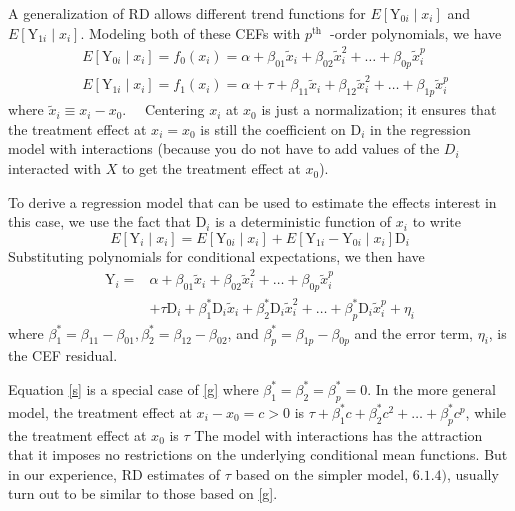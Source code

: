 \documentclass[11pt]{book}%
\begin{document}
A generalization of RD  allows different trend functions for $E\left[\mathrm{Y}_{0 i} \mid x_{i}\right]$ and $E\left[\mathrm{Y}_{1 i} \mid x_{i}\right] .$
Modeling both of these CEFs with $p^{\text {th }}$ -order polynomials, we have
$$
\begin{aligned}
&E\left[\mathrm{Y}_{0 i} \mid x_{i}\right]=f_{0}\left(x_{i}\right)=\alpha+\beta_{01} \tilde{x}_{i}+\beta_{02} \tilde{x}_{i}^{2}+\ldots+\beta_{0 p} \tilde{x}_{i}^{p} \\
&E\left[\mathrm{Y}_{1 i} \mid x_{i}\right]=f_{1}\left(x_{i}\right)=\alpha+\tau+\beta_{11} \tilde{x}_{i}+\beta_{12} \tilde{x}_{i}^{2}+\ldots+\beta_{1 p} \tilde{x}_{i}^{p}
\end{aligned}
$$
where $\tilde{x}_{i} \equiv x_{i}-x_{0} . \quad$ Centering $x_{i}$ at $x_{0}$ is just a normalization; it ensures that the treatment effect at
$x_{i}=x_{0}$ is still the coefficient on $\mathrm{D}_{i}$ in the regression model with interactions (because you do not have to add values of the $D_{i}$ interacted with $X$ to get the treatment effect at $x_{0}$).

To derive a regression model that can be used to estimate the effects interest in this case, we use the fact
that $\mathrm{D}_{i}$ is a deterministic function of $x_{i}$ to write
$$
E\left[\mathrm{Y}_{i} \mid x_{i}\right]=E\left[\mathrm{Y}_{0 i} \mid x_{i}\right]+E\left[\mathrm{Y}_{1 i}-\mathrm{Y}_{0 i} \mid x_{i}\right] \mathrm{D}_{i}
$$
Substituting polynomials for conditional expectations, we then have
\begin{equation}\label{g}
\begin{aligned}
\mathrm{Y}_{i}=& \alpha+\beta_{01} \tilde{x}_{i}+\beta_{02} \tilde{x}_{i}^{2}+\ldots+\beta_{0 p} \tilde{x}_{i}^{p} \\
&+\tau \mathrm{D}_{i}+\beta_{1}^{*} \mathrm{D}_{i} \tilde{x}_{i}+\beta_{2}^{*} \mathrm{D}_{i} \tilde{x}_{i}^{2}+\ldots+\beta_{p}^{*} \mathrm{D}_{i} \tilde{x}_{i}^{p}+\eta_{i}
\end{aligned}
\end{equation}
where $\beta_{1}^{*}=\beta_{11}-\beta_{01}, \beta_{2}^{*}=\beta_{12}-\beta_{02}$, and $\beta_{p}^{*}=\beta_{1 p}-\beta_{0 p}$ and the error term, $\eta_{i}$, is the CEF residual. 

Equation \ref{s} is a special case of \ref{g} where $\beta_{1}^{*}=\beta_{2}^{*}=\beta_{p}^{*}=0 .$ In the more general model, the treatment effect at $x_{i}-x_{0}=c>0$ is $\tau+\beta_{1}^{*} c+\beta_{2}^{*} c^{2}+\ldots+\beta_{p}^{*} c^{p}$, while the treatment effect at $x_{0}$ is $\tau$
The model with interactions has the attraction that it imposes no restrictions on the underlying conditional
mean functions. But in our experience, RD estimates of $\tau$ based on the simpler model, $6.1 .4)$, usually turn
out to be similar to those based on \ref{g}.
\end{document}

